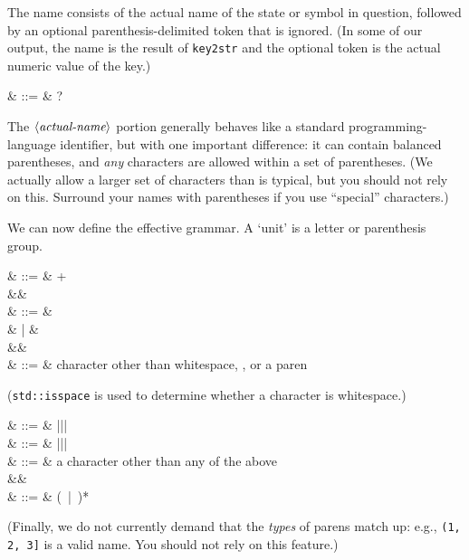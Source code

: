 The name consists of the actual name of the state or symbol
in question, followed by an optional parenthesis-delimited token that
is ignored. (In some of our output, the name is the result of
\texttt{key2str} and the optional token is the actual numeric value of
the key.)

\begin{grammar}
   & ::= &  \cfgsp  {}?
\end{grammar}

The $\langle\textit{actual-name}\rangle$ portion generally behaves like a standard
programming-language identifier, but with one important difference: it can
contain
balanced parentheses, and \textsl{any} characters are allowed within a
set of parentheses. (We actually allow a larger set of characters than
is typical, but you should not rely on this. Surround your names
with parentheses if you use ``special'' characters.)

We can now define the effective grammar. A `unit' is a letter or
parenthesis group.

\begin{grammar}
   & ::= &  + \\
&& \\
   & ::= &   \\
                 &   | &   \\
&& \\
  & ::= &  \textrm{character other than whitespace, \term{,}, or a paren}
\end{grammar}

(\texttt{std::isspace} is used to determine whether a character is
  whitespace.)

\begin{grammar}
    & ::= &  \term{(}\cfgsp |\cfgsp \term{\{}\cfgsp |\cfgsp \term{[}\cfgsp |\cfgsp \term{$<$} \\
   & ::= &  \term{)}\cfgsp |\cfgsp \term{\}}\cfgsp |\cfgsp \term{]}\cfgsp |\cfgsp \term{$>$} \\
   & ::= &  \textrm{a character other than any of the above} \\
&& \\
  & ::= &  \cfgsp  (\ |\ )*\cfgsp  {}
\end{grammar}

(Finally, we do not currently demand that the \textsl{types} of parens
  match up: e.g., \texttt{(1, 2, 3]} is a valid name. You should not
    rely on this feature.)
